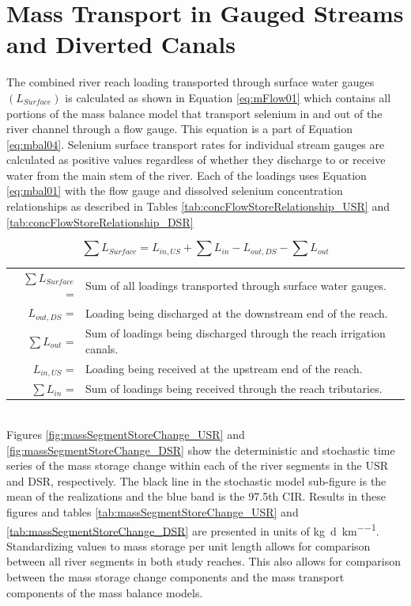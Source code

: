 
\clearpage{}
\section{Mass Transport in Gauged Streams and Diverted Canals}
\label{sec:MassTransport}


The combined river reach loading transported through surface water gauges $(L_{Surface})$ is calculated as shown in Equation \ref{eq:mFlow01} which contains all portions of the mass balance model that transport selenium in and out of the river channel through a flow gauge.  This equation is a part of Equation \ref{eq:mbal04}.  Selenium surface transport rates for individual stream gauges are calculated as positive values regardless of whether they discharge to or receive water from the main stem of the river.  Each of the loadings uses Equation \ref{eq:mbal01} with the flow gauge and dissolved selenium concentration relationships as described in Tables \ref{tab:concFlowStoreRelationship_USR} and \ref{tab:concFlowStoreRelationship_DSR}

\begin{equation}
	\sum L_{Surface} =  L_{in,US} + \sum L_{in} - L_{out,DS} - \sum L_{out} 
\label{eq:mFlow01}
\end{equation}
\begin{tabular}{r p{5.25in}}
	$ \sum L_{Surface} $ = & Sum of all loadings transported through surface water gauges.\\
	$ L_{out,DS} $ = & Loading being discharged at the downstream end of the reach. \\
	$ \sum L_{out} $ = & Sum of loadings being discharged through the reach irrigation canals.\\
	$ L_{in,US} $ = & Loading being received at the upstream end of the reach. \\
	$ \sum L_{in} $ = & Sum of loadings being received through the reach tributaries.\\
\end{tabular}\\

Figures \ref{fig:massSegmentStoreChange_USR} and \ref{fig:massSegmentStoreChange_DSR} show the deterministic and stochastic time series of the mass storage change within each of the river segments in the USR and DSR, respectively.  The black line in the stochastic model sub-figure is the mean of the realizations and the blue band is the 97.5th CIR.   Results in these figures and tables \ref{tab:massSegmentStoreChange_USR} and \ref{tab:massSegmentStoreChange_DSR} are presented in units of \si{\kilo\gram\per\day\per\kilo\meter}.  Standardizing values to mass storage per unit length allows for comparison between all river segments in both study reaches.  This also allows for comparison between the mass storage change components and the mass transport components of the mass balance models.

